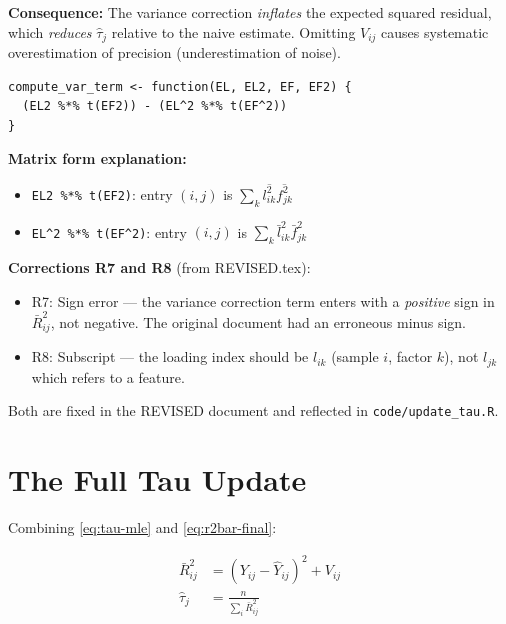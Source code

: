 \documentclass[11pt]{article}
\newcommand{\lbar}[2]{\bar{l}_{#1#2}}
\newcommand{\fbar}[2]{\bar{f}_{#1#2}}
\newcommand{\lsec}[2]{\overline{l^2_{#1#2}}}
\newcommand{\fsec}[2]{\overline{f^2_{#1#2}}}
\begin{document}
\textbf{Consequence:} The variance correction \emph{inflates} the expected
squared residual, which \emph{reduces} $\hat{\tau}_j$ relative to the naive
estimate.  Omitting $V_{ij}$ causes systematic overestimation of precision
(underestimation of noise).

\begin{codebox}
\begin{verbatim}
compute_var_term <- function(EL, EL2, EF, EF2) {
  (EL2 %*% t(EF2)) - (EL^2 %*% t(EF^2))
}
\end{verbatim}

\textbf{Matrix form explanation:}
\begin{itemize}
  \item \texttt{EL2 \%*\% t(EF2)}: entry $(i,j)$ is $\sum_k\lsec{i}{k}\fsec{j}{k}$
  \item \texttt{EL\^{}2 \%*\% t(EF\^{}2)}: entry $(i,j)$ is $\sum_k\lbar{i}{k}^2\fbar{j}{k}^2$
\end{itemize}
\end{codebox}

\begin{correctionbox}
\textbf{Corrections R7 and R8} (from REVISED.tex):
\begin{itemize}
  \item R7: Sign error — the variance correction term enters with a
    \emph{positive} sign in $\bar{R}^2_{ij}$, not negative.
    The original document had an erroneous minus sign.
  \item R8: Subscript — the loading index should be $l_{ik}$ (sample $i$,
    factor $k$), not $l_{jk}$ which refers to a feature.
\end{itemize}
Both are fixed in the REVISED document and reflected in \texttt{code/update\_tau.R}.
\end{correctionbox}

\section{The Full Tau Update}\label{sec:update}

Combining \eqref{eq:tau-mle} and \eqref{eq:r2bar-final}:

\begin{align}
  \bar{R}^2_{ij} &= (Y_{ij} - \hat{Y}_{ij})^2 + V_{ij} \label{eq:r2bar-combined} \\[6pt]
  \hat{\tau}_j &= \frac{n}{\sum_i \bar{R}^2_{ij}} \label{eq:tau-hat}
\end{align}
\end{document}
